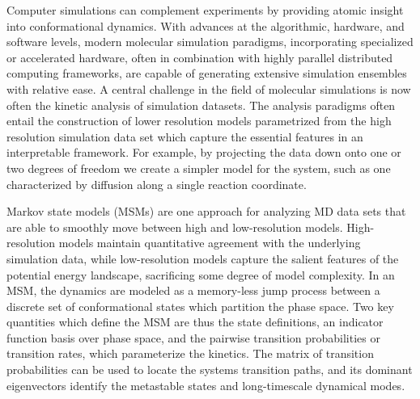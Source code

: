 \documentclass[journal=jpcbfk, layout=traditional, manuscript=article]{achemso}
\begin{document}
Computer simulations can complement experiments by providing atomic insight into conformational dynamics. With advances at the algorithmic, hardware, and software levels, modern molecular simulation paradigms, incorporating specialized or accelerated hardware, often in combination with highly parallel distributed computing frameworks, are capable of generating extensive simulation ensembles with relative ease\cite{Gotz2012Routine, Eastman2013OpenMM, Shirts2000Screen, Shaw2009Millisecond, Hess2008PLINCS, Buch2010High}. A central challenge in the field of molecular simulations is now often the kinetic analysis of simulation datasets. The analysis paradigms often entail the construction of lower resolution models parametrized from the high resolution simulation data set which capture the essential features in an interpretable framework\cite{Freddolino2010Challenges, Lane2013Milliseconds}. For example, by projecting the data down onto one or two degrees of freedom we create a simpler model for the system, such as one characterized by diffusion along a single reaction coordinate\cite{Best2010Coordinate}.

Markov state models (MSMs) are one approach for analyzing MD data sets that are able to smoothly move between high and low-resolution models\cite{Chodera2007Automatic, Prinz2011Markov, Beauchamp2012Simple, Bowman2013Quantitative}. High-resolution  models maintain quantitative agreement with the underlying simulation data, while low-resolution models capture the salient features of the potential energy landscape, sacrificing some degree of model complexity. In an MSM, the dynamics are modeled as a memory-less jump process between a discrete set of conformational states which partition the phase space. Two key quantities which define the MSM are thus the state definitions, an indicator function basis over phase space, and the pairwise transition probabilities or transition rates, which parameterize the kinetics. The matrix of transition probabilities can be used to locate the systems transition paths\cite{Weinan2006Towards}, and its dominant eigenvectors identify the metastable states\cite{Deuflhard2000Identification} and long-timescale dynamical modes\cite{who?}.

\end{document}
